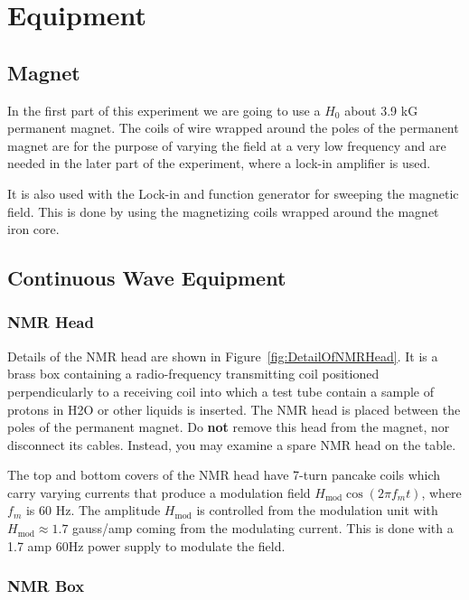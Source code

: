 \documentclass{../lab}
\begin{document}
\section{Equipment}

\subsection{Magnet}

In the first part of this experiment we are going to use a $H_0$ about 3.9 kG permanent magnet. The coils of wire wrapped around the poles of the permanent magnet are for the purpose of varying the field at a very low frequency and are needed in the later part of the experiment, where a lock-in amplifier is used.

It is also used with the Lock-in and function generator for sweeping the magnetic field. This is done by using the magnetizing coils wrapped around the magnet iron core.
\subsection{Continuous Wave Equipment}

\subsubsection{NMR Head}

Details of the NMR head are shown in Figure~\ref{fig:DetailOfNMRHead}. It is a brass box containing a radio-frequency transmitting coil positioned perpendicularly to a receiving coil into which a test tube contain a sample of protons in H2O or other liquids is inserted. The NMR head is placed between the poles of the permanent magnet. Do \textbf{not} remove this head from the magnet, nor disconnect its cables. Instead, you may examine a spare NMR head on the table.

The top and bottom covers of the NMR head have 7-turn pancake coils which carry varying currents that produce a modulation field $H_\text{mod} \cos(2 \pi f_m t)$, where $f_m$ is 60 Hz. The amplitude $H_\text{mod}$ is controlled from the modulation unit with $H_\text{mod} \approx 1.7$ gauss/amp coming from the modulating current. This is done with a 1.7 amp 60Hz power supply to modulate the field.

\subsubsection{NMR Box}
\end{document}
